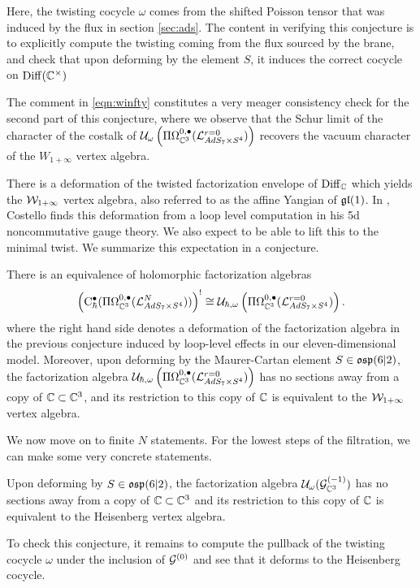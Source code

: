 Here, the twisting cocycle $\omega$ comes from the shifted Poisson tensor that was induced by the flux in section \ref{sec:ads}. The content in verifying this conjecture is to explicitly compute the twisting coming from the flux sourced by the brane, and check that upon deforming by the element $S$, it induces the correct cocycle on $\operatorname{Diff}(\mathbb{C}^\times)$

The comment in \ref{eqn:winfty} constitutes a very meager consistency check for the second part of this conjecture, where we observe that the Schur limit of the character of the costalk of $\mathcal{U}_{\omega} \left ( \Pi\Omega^{0,\bullet}_{\mathbb{C}^3} (\mathcal{L}^{r=0}_{AdS_7\times S^4} ) \right)$ recovers the vacuum character of the $W_{1+\infty}$ vertex algebra.

There is a deformation of the twisted factorization envelope of $\operatorname{Diff}_{\mathbb{C}}$ which yields the $\mathcal{W}_{1+\infty}$ vertex algebra, also referred to as the affine Yangian of $\mathfrak{gl}(1)$. In \cite{CostelloM5}, Costello finds this deformation from a loop level computation in his 5d noncommutative gauge theory. We also expect to be able to lift this to the minimal twist. We summarize this expectation in a conjecture. 

\begin{conj}
There is an equivalence of holomorphic factorization algebras \[ \left( {\mathrm{C}}^\bullet_\hbar (\Pi\Omega^{0,\bullet}_{\mathbb{C}^3} (\mathcal{L}^N_{AdS_7\times S^4}))\right)^!\cong \mathcal{U}_{\hbar, \omega} \left ( \Pi\Omega^{0,\bullet}_{\mathbb{C}^3} (\mathcal{L}^{r=0}_{AdS_7\times S^4} )\right ).\] where the right hand side denotes a deformation of the factorization algebra in the previous conjecture induced by loop-level effects in our eleven-dimensional model. Moreover, upon deforming by the Maurer-Cartan element $S\in \mathfrak{osp}(6|2)$, the factorization algebra $\mathcal{U}_{\hbar, \omega} \left ( \Pi\Omega^{0,\bullet}_{\mathbb{C}^3} (\mathcal{L}^{r=0}_{AdS_7\times S^4} )\right )$ has no sections away from a copy of $\mathbb{C}\subset \mathbb{C}^3$, and its restriction to this copy of $\mathbb{C}$ is equivalent to the $\mathcal{W}_{1+\infty}$ vertex algebra.
\end{conj}

\parsec[]
We now move on to finite $N$ statements. For the lowest steps of the filtration, we can make some very concrete statements.

\begin{conj}
Upon deforming by $S\in \mathfrak{osp}(6|2)$, the factorization algebra $\mathcal{U}_\omega (\mathcal{G}^{(-1)}_{\mathbb{C}^3} )$ has no sections away from a copy of $\mathbb{C}\subset \mathbb{C}^3$ and its restriction to this copy of $\mathbb{C}$ is equivalent to the Heisenberg vertex algebra.
\end{conj}
To check this conjecture, it remains to compute the pullback of the twisting cocycle $\omega$ under the inclusion of $\mathcal{G}^{(0)}$ and see that it deforms to the Heisenberg cocycle. 

